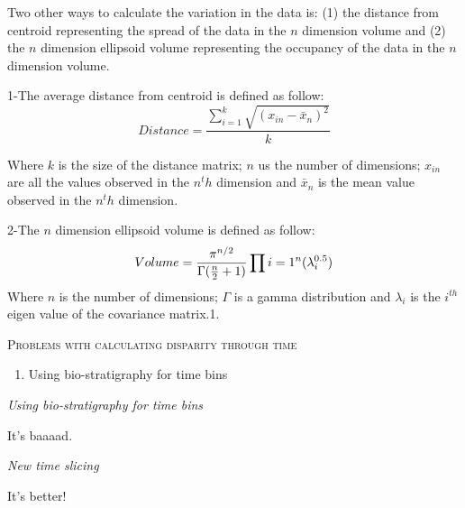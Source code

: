 \documentclass[12pt,letterpaper]{article}
\renewcommand{\section}[1]{%
\bigskip
\begin{center}
\begin{Large}
\normalfont\scshape #1
\medskip
\end{Large}
\end{center}}
\renewcommand{\subsection}[1]{%
\bigskip
\begin{center}
\begin{large}
\normalfont\itshape #1
\end{large}
\end{center}}
\begin{document}
Two other ways to calculate the variation in the data is: (1) the distance from centroid \cite{finlay2015morphological} representing the spread of the data in the $n$ dimension volume and (2) the $n$ dimension ellipsoid volume \cite{DonohueDim} representing the occupancy of the data in the $n$ dimension volume.

1-The average distance from centroid is defined as follow:
\begin{equation}
Distance=\frac{{\sum\limits_{i=1}^k \sqrt{(x_{in}-\bar{x}_{n})^2}}}{k}
\end{equation}

Where $k$ is the size of the distance matrix; $n$ us the number of dimensions; $x_{in}$ are all the values observed in the $n^th$ dimension and $\bar{x}_{n}$ is the mean value observed in the $n^th$ dimension.

2-The $n$ dimension ellipsoid volume is defined as follow:
\begin{equation}
Volume={{\pi^{n/2}} \over {\Gamma({n\over2}+1)}}\prod\limits{i=1}^n(\lambda_{i}^{0.5})
\end{equation}
Where $n$ is the number of dimensions; $\Gamma$ is a gamma distribution and $\lambda_i$ is the $i^{th}$ eigen value of the covariance matrix.1.


\section{Problems with calculating disparity through time}

\begin{enumerate}
\item{Using bio-stratigraphy for time bins}
\end{enumerate}

\subsection{Using bio-stratigraphy for time bins}

It's baaaad.

\subsection{New time slicing}

It's better!
\end{document}
